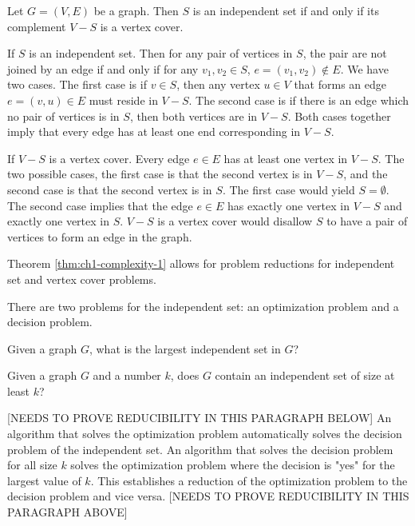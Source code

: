\begin{thm}\label{thm:ch1-complexity-1}
Let $G = (V,E)$ be a graph.  Then $S$ is an independent set if and only if its complement $V-S$ is a 
vertex cover.
\end{thm}
\begin{pf}
If $S$ is an independent set. Then for any pair of vertices in $S$, the pair are not joined by an 
edge if and only if for any $v_1, v_2 \in S$, $e = \left( v_1, v_2 \right) \not \in E$.  We have two 
cases.  The first case is if $v \in S$, then any vertex $u \in V$ that forms an edge $e = (v,u) \in 
E$ must reside in $V-S$. The second case is if there is an edge which no pair of vertices is in $S$, 
then both vertices are in $V-S$.  Both cases together imply that every edge has at least one end 
corresponding in $V-S$. 


If $V-S$ is a vertex cover.  Every edge $e \in E$ has at least one vertex in $V-S$.  The two 
possible cases, the first case is that the second vertex is in $V-S$, and the second case is that 
the second vertex is in $S$.  The first case would yield $S = \emptyset$.  The second case implies 
that the edge $e \in E$ has exactly one vertex in $V-S$ and exactly one vertex in $S$.  $V-S$ is a 
vertex cover would disallow $S$ to have a pair of vertices to form an edge in the graph.
\end{pf}
Theorem \ref{thm:ch1-complexity-1} allows for problem reductions for independent set and vertex 
cover problems.

There are two problems for the independent set: an optimization problem and a decision problem.
\begin{prob}
Given a graph $G$, what is the largest independent set in $G$?
\end{prob}
\begin{prob}
Given a graph $G$ and a number $k$, does $G$ contain an independent set of size at least $k$?
\end{prob}
[NEEDS TO PROVE REDUCIBILITY IN THIS PARAGRAPH BELOW]
An algorithm that solves the optimization problem automatically solves the decision problem of the 
independent set.  An algorithm that solves the decision problem for all size $k$ solves the 
optimization problem where the decision is "yes" for the largest value of $k$.  This establishes a 
reduction of the optimization problem to the decision problem and vice versa. 
[NEEDS TO PROVE REDUCIBILITY IN THIS PARAGRAPH ABOVE]



